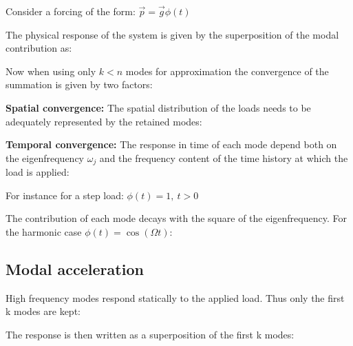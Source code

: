 \documentclass[10pt,a4paper]{scrartcl}
\begin{document}
\begin{multicols*}{2}
Consider a forcing of the form: $\vec{p}=\vec{g}\phi(t)$

The physical response of the system is given by the superposition of the modal contribution as:


Now when using only $k<n$ modes for approximation the convergence of the summation is given by two factors:

\vspace{3ex}

\textbf{Spatial convergence:} The spatial distribution of the loads needs to be adequately represented by the retained modes:


\textbf{Temporal convergence:} The response in time of each mode depend both on the eigenfrequency $\omega_j$ and the frequency content of the time history at which the load is applied:


For instance for a step load: $\phi(t)=1,\ t>0$


The contribution of each mode decays with the square of the eigenfrequency. For the harmonic case $\phi(t)=\cos(\Omega t)$:


\subsection{Modal acceleration}

High frequency modes respond statically to the applied load. Thus only the first k modes are kept:


The response is then written as a superposition of the first k modes:



\end{multicols*}
\end{document}
